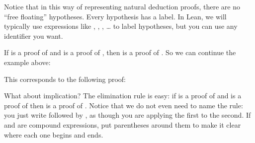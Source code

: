 \documentclass[letterpaper,10pt,english]{sphinxmanual}
\begin{document}
\begin{center}
\AXM{}
\DP
\quad\quad
\AXM{}
\DP
\end{center}

\sphinxAtStartPar
Notice that in this way of representing natural deduction proofs, there are no “free floating” hypotheses. Every hypothesis has a label. In Lean, we will typically use expressions like , , , … to label hypotheses, but you can use any identifier you want.

\sphinxAtStartPar
If  is a proof of  and  is a proof of , then  is a proof of . So we can continue the example above:

\begin{sphinxVerbatim}[commandchars=\\\{\}]
      

     
\end{sphinxVerbatim}

\sphinxAtStartPar
This corresponds to the following proof:



\begin{center}
\AXM{}
\AXM{}
\DP
\end{center}

\sphinxAtStartPar
What about implication? The elimination rule is easy: if  is a proof of  and  is a proof of  then  is a proof of . Notice that we do not even need to name the rule: you just write  followed by , as though you are applying the first to the second. If  and  are compound expressions, put parentheses around them to make it clear where each one begins and ends.
\end{document}
